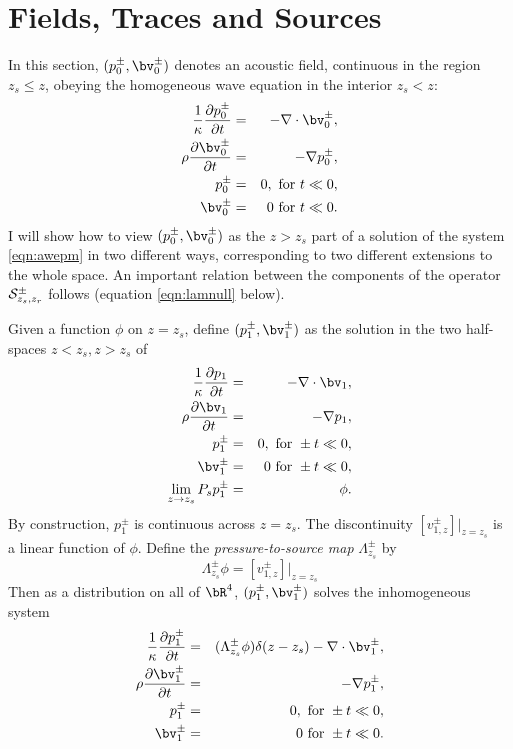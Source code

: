 \section{Fields, Traces and Sources}
In this section, $(p^{\pm}_0,\bv^{\pm}_0)$ denotes an acoustic field,
continuous in the region $z_s \le z $, obeying the homogeneous wave
equation in the interior $z_s < z $:
\begin{eqnarray}
\label{eqn:awe1}
  \frac{1}{\kappa}\frac{\partial p^{\pm}_0}{\partial t} & = & - \nabla \cdot \bv^{\pm}_0, \nonumber \\
  \rho\frac{\partial \bv^{\pm}_0}{\partial t} & = & - \nabla
                                                    p^{\pm}_0, \nonumber \\
  p^{\pm}_0 & =& 0,  \mbox{ for } t \ll 0, \nonumber\\ 
  \bv^{\pm}_0 & = & 0 \mbox{ for } t \ll 0.
\end{eqnarray}
I will show how to view $(p^{\pm}_0,\bv^{\pm}_0)$ as the $z>z_s$ part
of a solution of the system \ref{eqn:awepm} in two different ways,
corresponding to two different extensions to the whole space. An
important relation between the components of the operator
${\cal S}^{\pm}_{z_s,z_r}$ follows (equation \ref{eqn:lamnull} below).

Given a function $\phi$ on $z=z_s$, define $(p^{\pm}_1,\bv^{\pm}_1)$
as the solution in the two half-spaces $z <z_s, z>z_s$ of
\begin{eqnarray}
\label{eqn:awe1}
  \frac{1}{\kappa}\frac{\partial p_1}{\partial t} & = & - \nabla \cdot \bv_1, \nonumber \\
  \rho\frac{\partial \bv_1}{\partial t} & = & - \nabla p_1,\nonumber \\
  p^{\pm}_1 & =& 0,  \mbox{ for } \pm t \ll 0,\nonumber\\ 
  \bv^{\pm}_1 & = & 0 \mbox{ for } \pm t \ll 0,\nonumber\\
  \lim_{z \rightarrow z_s} P_sp^{\pm}_1& =& \phi.
\end{eqnarray}
By construction, $p^{\pm}_1$ is continuous across $z=z_s$. The
discontinuity $[v^{\pm}_{1,z}]|_{z=z_s}$ is a linear function of
$\phi$. Define the {\em pressure-to-source map} $\Lambda^{\pm}_{z_s}$ by
\begin{equation}
  \label{eqn:deflam}
  \Lambda^{\pm}_{z_s}\phi = [v^{\pm}_{1,z}]|_{z=z_s}
\end{equation}
Then as a distribution on all of $\bR^4$, $(p^{\pm}_1,\bv^{\pm}_1)$ solves the
inhomogeneous system
\begin{eqnarray}
\label{eqn:sawe1}
  \frac{1}{\kappa}\frac{\partial p^{\pm}_1}{\partial t} & = &
                                                        (\Lambda^{\pm}_{z_s}\phi)\delta(z-z_s) - \nabla \cdot \bv^{\pm}_1, \nonumber \\
  \rho\frac{\partial \bv^{\pm}_1}{\partial t} & = & - \nabla p^{\pm}_1,\nonumber \\
  p^{\pm}_1 & =& 0,  \mbox{ for } \pm t \ll 0,\nonumber\\ 
  \bv^{\pm}_1 & = & 0 \mbox{ for } \pm t \ll 0.
\end{eqnarray}

